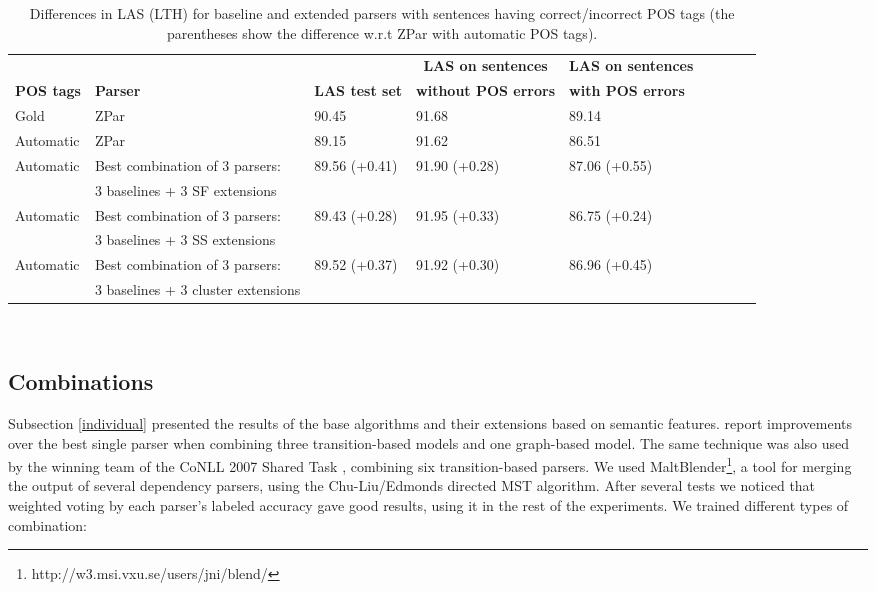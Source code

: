 \documentclass[11pt]{article}
\begin{document}
\begin{table*}[t]
\centering
\scriptsize
\begin{tabular}{ |l||l|l|l|l|c|c|c|c|} \hline 
& &  & \multicolumn{1}{c|}{{\bf LAS on sentences}}  & \multicolumn{1}{c|}{{\bf LAS on sentences}}  \\
\bf{POS tags} & {\bf Parser} & {\bf LAS test set} & {\bf  without POS errors} & {\bf with POS errors}  \\ \hline \hline
Gold  & ZPar & 90.45 & 91.68 & 89.14 \\ \hline 
Automatic & ZPar  & 89.15 &  91.62 & 86.51   \\  \hline 
Automatic & Best combination of 3 parsers:  & 89.56 (+0.41) & 91.90 (+0.28) & 87.06 (+0.55)  \\  
&  3 baselines + 3 SF extensions  & & & \\ \hline 
Automatic& Best combination of 3 parsers:  & 89.43 (+0.28)  & 91.95 (+0.33) & 86.75 (+0.24) \\  
&  3 baselines + 3 SS extensions & &  & \\ \hline 
Automatic & Best combination of 3 parsers: & 89.52 (+0.37) & 91.92 (+0.30) & 86.96 (+0.45) \\  
 &  3 baselines + 3 cluster extensions & & & \\ \hline 
\end{tabular}
\\
\caption{\label{t9} Differences in LAS (LTH) for baseline and extended parsers with sentences having correct/incorrect POS tags (the  parentheses show the difference w.r.t ZPar with automatic POS tags).}
 \end{table*}

\subsection{Combinations}\label{Combinations}
Subsection \ref{individual} presented the results of the base algorithms and their extensions based on  semantic features.  report improvements over the best single
parser when combining three transition-based models and one graph-based model. The same
technique was also used by the winning team of the CoNLL 2007 Shared Task \cite{hal2007}, combining 
six transition-based parsers. 
We used MaltBlender\footnote{http://w3.msi.vxu.se/users/jni/blend/}, a tool for merging the output 
of several dependency parsers, using the Chu-Liu/Edmonds directed MST algorithm. 
After several tests we noticed that weighted voting by each parser's labeled accuracy gave good 
results, using it in the rest of the experiments. We trained different types of combination:
\end{document}
